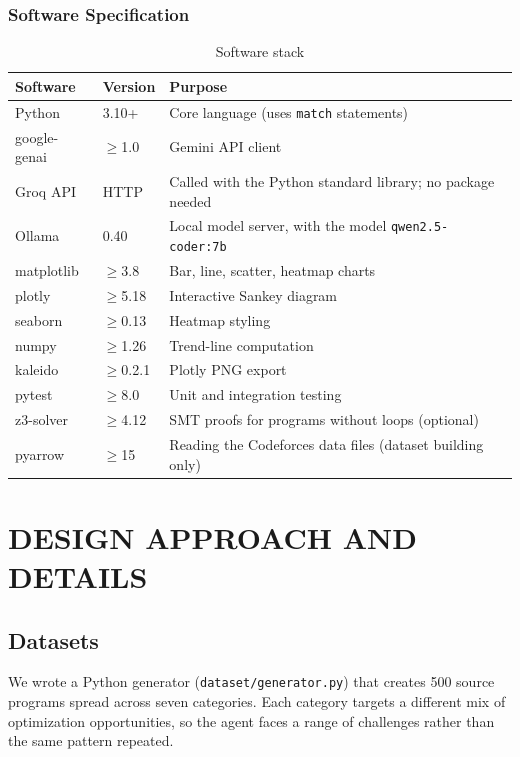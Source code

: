 \documentclass[12pt,a4paper]{report}
\begin{document}
\subsection{Software Specification}

\begin{table}[H]
\centering
\caption{Software stack}
\label{tab:software}
\begin{tabularx}{\textwidth}{|l|l|X|}
\hline
\textbf{Software} & \textbf{Version} & \textbf{Purpose} \\
\hline
Python & 3.10+ & Core language (uses \texttt{match} statements) \\
\hline
google-genai & $\geq$1.0 & Gemini API client \\
\hline
Groq API & HTTP & Called with the Python standard library; no package needed \\
\hline
Ollama & 0.40 & Local model server, with the model \texttt{qwen2.5-coder:7b} \\
\hline
matplotlib & $\geq$3.8 & Bar, line, scatter, heatmap charts \\
\hline
plotly & $\geq$5.18 & Interactive Sankey diagram \\
\hline
seaborn & $\geq$0.13 & Heatmap styling \\
\hline
numpy & $\geq$1.26 & Trend-line computation \\
\hline
kaleido & $\geq$0.2.1 & Plotly PNG export \\
\hline
pytest & $\geq$8.0 & Unit and integration testing \\
\hline
z3-solver & $\geq$4.12 & SMT proofs for programs without loops (optional) \\
\hline
pyarrow & $\geq$15 & Reading the Codeforces data files (dataset building only) \\
\hline
\end{tabularx}
\end{table}


\chapter{DESIGN APPROACH AND DETAILS}

\section{Datasets}
\label{sec:datasets}

We wrote a Python generator (\texttt{dataset/generator.py}) that creates 500 source programs spread across seven categories. Each category targets a different mix of optimization opportunities, so the agent faces a range of challenges rather than the same pattern repeated.
\end{document}
